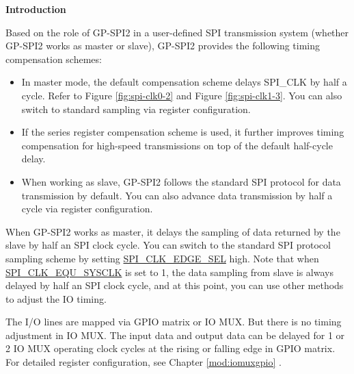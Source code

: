\documentclass[main\_\_EN.tex]{subfiles}
\begin{document}
\textbf{Introduction}

Based on the role of GP-SPI2 in a user-defined SPI transmission system (whether GP-SPI2 works as master or slave), GP-SPI2 provides the following timing compensation schemes:
\begin{itemize}
    \item In master mode, the default compensation scheme delays SPI\_CLK by half a cycle. Refer to Figure \ref{fig:spi-clk0-2} and Figure \ref{fig:spi-clk1-3}. You can also switch to standard sampling via register configuration.
    \item If the series register compensation scheme is used, it further improves timing compensation for high-speed transmissions on top of the default half-cycle delay.
    \item When working as slave, GP-SPI2 follows the standard SPI protocol for data transmission by default. You can also advance data transmission by half a cycle via register configuration.
\end{itemize}

When GP-SPI2 works as master, it delays the sampling of data returned by the slave by half an SPI clock cycle. You can switch to the standard SPI protocol sampling scheme by setting \hyperref[fielddesc:SPICLKEDGESEL]{SPI\_CLK\_EDGE\_SEL} high. Note that when \hyperref[fielddesc:SPICLKEQUSYSCLK]{SPI\_CLK\_EQU\_SYSCLK} is set to 1, the data sampling from slave is always delayed by half an SPI clock cycle, and at this point, you can use other methods to adjust the IO timing.

The I/O lines are mapped via GPIO matrix or IO MUX. But there is no timing adjustment in IO MUX. The input data and output data can be delayed for 1 or 2 IO MUX operating clock cycles at the rising or falling edge in GPIO matrix. For detailed register configuration, see Chapter \ref{mod:iomuxgpio} \textit{}.
\end{document}
